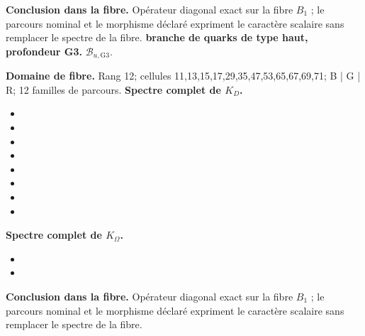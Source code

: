 \noindent\textbf{Conclusion dans la fibre.} Opérateur diagonal exact sur la fibre \(B_1\) ; le parcours nominal et le morphisme déclaré expriment le caractère scalaire sans remplacer le spectre de la fibre.
\medskip
{}
\noindent\textbf{branche de quarks de type haut, profondeur G3.} \(\mathcal B_{u,\mathrm{G3}}\).\par
\noindent\textbf{Domaine de fibre.} Rang 12; cellules 11,13,15,17,29,35,47,53,65,67,69,71; B | G | R; 12 familles de parcours.
\noindent\textbf{Spectre complet de \(K_D\).}
\begin{itemize}
\item \texttt{}
\item \texttt{}
\item \texttt{}
\item \texttt{}
\item \texttt{}
\item \texttt{}
\item \texttt{}
\item \texttt{}
\end{itemize}
\noindent\textbf{Spectre complet de \(K_\Omega\).}
\begin{itemize}
\item \texttt{}
\item \texttt{}
\end{itemize}
\noindent\textbf{Conclusion dans la fibre.} Opérateur diagonal exact sur la fibre \(B_1\) ; le parcours nominal et le morphisme déclaré expriment le caractère scalaire sans remplacer le spectre de la fibre.
\medskip
\endgroup
